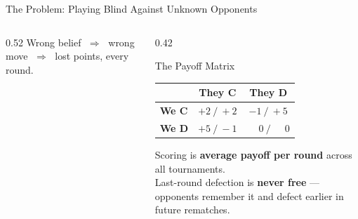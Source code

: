 \documentclass[aspectratio=169, 10pt]{beamer}
\begin{document}
\begin{frame}{The Problem: Playing Blind Against Unknown Opponents}
\begin{columns}[T]
\begin{column}{0.52\textwidth}
            \vspace{0.4cm}
            \textcolor{secondary}{Wrong belief $\;\Rightarrow\;$ wrong move $\;\Rightarrow\;$ lost points, every round.}
        \end{column}
        \begin{column}{0.42\textwidth}
            \begin{block}{The Payoff Matrix}
                \begin{table}
                    \centering\small
                    \begin{tabular}{lcc}
                        \toprule
                        & \textbf{They C} & \textbf{They D} \\
                        \midrule
                        \textbf{We C} & $+2\ /\ +2$ & $-1\ /\ +5$ \\
                        \textbf{We D} & $+5\ /\ -1$ & $\phantom{+}0\ /\ \phantom{+}0$ \\
                        \bottomrule
                    \end{tabular}
                \end{table}
            \end{block}
            \vspace{0.3cm}
            Scoring is \textbf{average payoff per round} across all tournaments.\\[6pt]
            Last-round defection is \textbf{never free} --- opponents remember it and defect earlier in future rematches.
        \end{column}
    \end{columns}
\end{frame}
\end{document}
